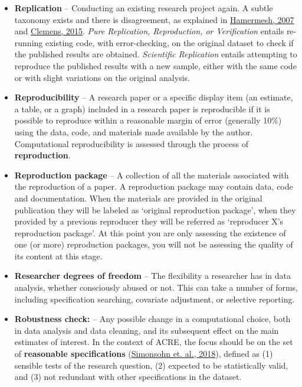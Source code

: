 \documentclass[
]{book}
\begin{document}
\begin{itemize}
\item
  \textbf{Replication} -- Conducting an existing research project again. A subtle taxonomy exists and there is disagreement, as explained in \href{https://poseidon01.ssrn.com/delivery.php?ID=730022068104120012124069127117116094125005035067064043105083109027064120011088086109059117052062000025007012029080123125089014014006079063116014095000023071022077006017094093005117096083119073115079022110105075073085121117103030106102080005099007\&EXT=pdf}{Hamermesh, 2007} and \href{https://www.cgdev.org/sites/default/files/CGD-Working-Paper-399-Clemens-Meaning-Failed-Replications.pdf}{Clemens, 2015}. \emph{Pure Replication, Reproduction, or Verification} entails re-running existing code, with error-checking, on the original dataset to check if the published results are obtained. \emph{Scientific Replication} entails attempting to reproduce the published results with a new sample, either with the same code or with slight variations on the original analysis.
\item
  \textbf{Reproducibility} -- A research paper or a specific display item (an estimate, a table, or a graph) included in a research paper is reproducible if it is possible to reproduce within a reasonable margin of error (generally 10\%) using the data, code, and materials made available by the author. Computational reproducibility is assessed through the process of \textbf{reproduction}.
\item
  \textbf{Reproduction package} -- A collection of all the materials associated with the reproduction of a paper. A reproduction package may contain data, code and documentation. When the materials are provided in the original publication they will be labeled as `original reproduction package', when they provided by a previous reproducer they will be referred as `reproducer X's reproduction package'. At this point you are only assessing the existence of one (or more) reproduction packages, you will not be assessing the quality of its content at this stage.
\item
  \textbf{Researcher degrees of freedom} -- The flexibility a researcher has in data analysis, whether consciously abused or not. This can take a number of forms, including specification searching, covariate adjustment, or selective reporting.
\item
  \textbf{Robustness check:} -- Any possible change in a computational choice, both in data analysis and data cleaning, and its subsequent effect on the main estimates of interest. In the context of ACRE, the focus should be on the set of \textbf{reasonable specifications} (\href{https://urisohn.com/sohn_files/wp/wordpress/wp-content/uploads/Paper-Specification-curve-2018-11-02.pdf}{Simonsohn et. al., 2018}), defined as (1) sensible tests of the research question, (2) expected to be statistically valid, and (3) not redundant with other specifications in the dataset.

\end{itemize}
\end{document}
